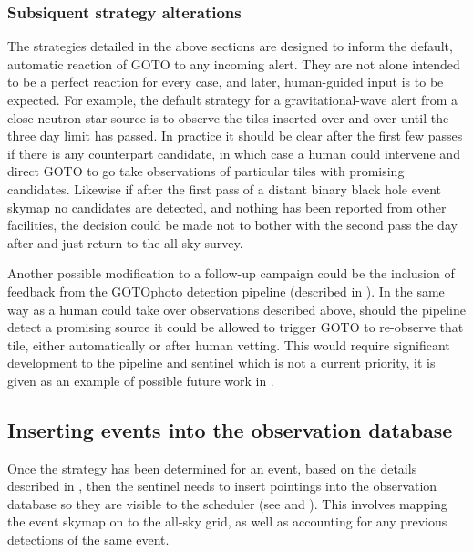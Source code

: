 \begin{colsection}
\begin{colsection}
\subsubsection{Subsiquent strategy alterations}

The strategies detailed in the above sections are designed to inform the default, automatic reaction of GOTO to any incoming alert. They are not alone intended to be a perfect reaction for every case, and later, human-guided input is to be expected. For example, the default strategy for a gravitational-wave alert from a close neutron star source is to observe the tiles inserted over and over until the three day limit has passed. In practice it should be clear after the first few passes if there is any counterpart candidate, in which case a human could intervene and direct GOTO to go take observations of particular tiles with promising candidates. Likewise if after the first pass of a distant binary black hole event skymap no candidates are detected, and nothing has been reported from other facilities, the decision could be made not to bother with the second pass the day after and just return to the all-sky survey.

Another possible modification to a follow-up campaign could be the inclusion of feedback from the GOTOphoto detection pipeline (described in ). In the same way as a human could take over observations described above, should the pipeline detect a promising source it could be allowed to trigger GOTO to re-observe that tile, either automatically or after human vetting. This would require significant development to the pipeline and sentinel which is not a current priority, it is given as an example of possible future work in .

\end{colsection}

\newpage
\subsection{Inserting events into the observation database}
\label{sec:event_insert}
\begin{colsection}

Once the strategy has been determined for an event, based on the details described in , then the sentinel needs to insert pointings into the observation database so they are visible to the scheduler (see  and ). This involves mapping the event skymap on to the all-sky grid, as well as accounting for any previous detections of the same event.


\end{colsection}
\end{colsection}
